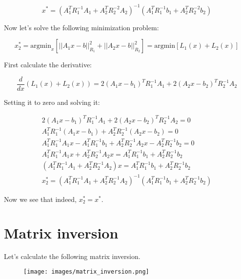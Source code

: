 \documentclass{article}
\begin{document}
\begin{equation}
    x^* = (A^T_1 R^{-1}_1 A_1 + A^T_2 R^{-2}_2 A_2)^{-1} (A^T_1 R^{-1}_1 b_1 + A^T_2 R^{-2}_2 b_2)
\end{equation}

Now let's solve the following minimization problem:

\begin{equation}
    x^*_2 = \text{argmin}_x \left[||A_1 x - b||^2_{R_1} + ||A_2 x - b||^2_{R_2}\right] = \text{argmin} \left[ L_1(x) + L_2(x) \right]
\end{equation}

First calculate the derivative:

\begin{equation}
    \frac{d}{dx} (L_1(x) + L_2(x)) = 2(A_1 x - b_1)^T R^{-1}_1 A_1 + 2(A_2 x - b_2)^T R^{-1}_2 A_2
\end{equation}

Setting it to zero and solving it:

\begin{equation}
    \begin{split}
        2(A_1 x - b_1)^T R^{-1}_1 A_1 + 2(A_2 x - b_2)^T R^{-1}_2 A_2 = 0\\
        A^T_1 R^{-1}_1 (A_1 x - b_1) + A^T_2 R^{-1}_2 (A_2 x - b_2) = 0\\
        A^T_1 R^{-1}_1 A_1 x - A^T_1 R^{-1}_1 b_1 + A^T_2 R^{-1}_2 A_2 x - A^T_2 R^{-1}_2 b_2 = 0\\
        A^T_1 R^{-1}_1 A_1 x + A^T_2 R^{-1}_2 A_2 x = A^T_1 R^{-1}_1 b_1 + A^T_2 R^{-1}_2 b_2 \\
        (A^T_1 R^{-1}_1 A_1 + A^T_2 R^{-1}_2 A_2) x = A^T_1 R^{-1}_1 b_1 + A^T_2 R^{-1}_2 b_2 \\
        x^*_2 = (A^T_1 R^{-1}_1 A_1 + A^T_2 R^{-1}_2 A_2)^{-1} (A^T_1 R^{-1}_1 b_1 + A^T_2 R^{-1}_2 b_2)
    \end{split}
\end{equation}

Now we see that indeed, $x^*_2 = x^*$.

\section{Matrix inversion}

Let's calculate the following matrix inversion.

\begin{figure}[ht]
 \centering
  \texttt{[image: images/matrix\_inversion.png]}
\end{figure}
\end{document}
